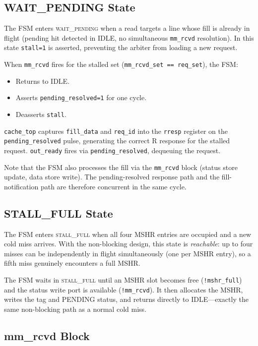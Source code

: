 \documentclass[12pt,letterpaper]{report}
\begin{document}
\subsection{WAIT\_PENDING State}

The FSM enters \textsc{wait\_pending} when a read targets a line
whose fill is already in flight (pending hit detected in IDLE, no
simultaneous \texttt{mm\_rcvd} resolution).  In this state
\texttt{stall=1} is asserted, preventing the arbiter from loading a
new request.

When \texttt{mm\_rcvd} fires for the stalled set (\texttt{mm\_rcvd\_set
== req\_set}), the FSM:
\begin{itemize}
  \item Returns to IDLE.
  \item Asserts \texttt{pending\_resolved=1} for one cycle.
  \item Deasserts \texttt{stall}.
\end{itemize}

\texttt{cache\_top} captures \texttt{fill\_data} and \texttt{req\_id}
into the \texttt{rresp} register on the \texttt{pending\_resolved}
pulse, generating the correct R response for the stalled request.
\texttt{out\_ready} fires via \texttt{pending\_resolved}, dequeuing
the request.

Note that the FSM also processes the fill via the \texttt{mm\_rcvd}
block (status store update, data store write).  The pending-resolved
response path and the fill-notification path are therefore concurrent
in the same cycle.

\subsection{STALL\_FULL State}

The FSM enters \textsc{stall\_full} when all four MSHR entries are
occupied and a new cold miss arrives.  With the non-blocking design,
this state is \emph{reachable}: up to four misses can be independently
in flight simultaneously (one per MSHR entry), so a fifth miss
genuinely encounters a full MSHR.

The FSM waits in \textsc{stall\_full} until an MSHR slot becomes free
(\texttt{!mshr\_full}) and the status write port is available
(\texttt{!mm\_rcvd}).  It then allocates the MSHR, writes the tag and
PENDING status, and returns directly to IDLE---exactly the same
non-blocking path as a normal cold miss.

\subsection{mm\_rcvd Block}
\end{document}
